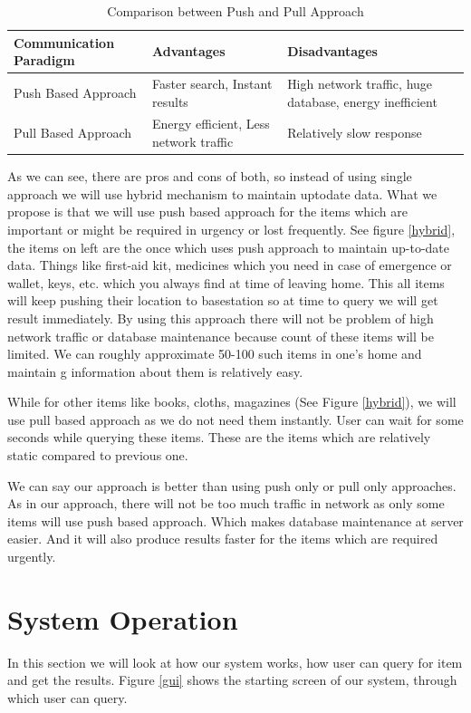 \documentclass [a4paper,12pt]{book}
\begin{document}
\begin{table}[h]
\centering
\caption{Comparison between Push and Pull Approach}
\vspace{0.2cm}
\label{comparision}
\begin{tabular}{|L|L|L|}
\hline
Communication Paradigm & Advantages & Disadvantages \\ \hline
Push Based Approach & Faster search, Instant results & High network traffic, huge database, energy inefficient \\ \hline
Pull Based Approach & Energy efficient, Less network traffic & Relatively slow response \\ \hline
\end{tabular}
\end{table}

As we can see, there are pros and cons of both, so instead of using single approach we will use hybrid mechanism to maintain uptodate data. What we propose is that we will use push based approach for the items which are important or might be required in urgency or lost frequently. See figure \ref{hybrid}, the items on left are the once which uses push approach to maintain up-to-date data. Things like first-aid kit, medicines which you need in case of emergence or wallet, keys, etc. which you always find at time of leaving home. This all items will keep pushing their location to basestation so at time to query we will get result immediately. By using this approach there will not be problem of high network traffic or database maintenance because count of these items will be limited. We can roughly approximate 50-100 such items in one's home and maintain g information about them is relatively easy.

While for other items like books, cloths, magazines (See Figure \ref{hybrid}), we will use pull based approach as we do not need them instantly. User can wait for some seconds while querying these items. These are the items which are relatively static compared to previous one.

We can say our approach is better than using push only or pull only approaches. As in our approach, there will not be too much traffic in network as only some items will use push based approach. Which makes database maintenance at server easier. And it will also produce results faster for the items which are required urgently.

\section{System Operation}
In this section we will look at how our system works, how user can query for item and get the results. Figure \ref{gui} shows the starting screen of our system, through which user can query. 
\end{document}
